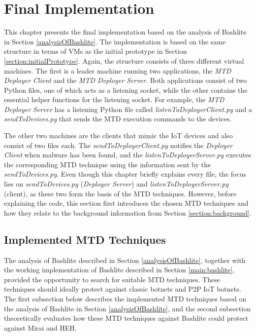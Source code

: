 





\section{Final Implementation} \label{section:finalImplementation}
This chapter presents the final implementation based on the analysis of Bashlite in Section \ref{analysisOfBashlite}. The implementation is based on the same structure in terms of VMs as the initial prototype in Section \ref{section:initialPrototype}. Again, the structure consists of three different virtual machines. The first is a leader machine running two applications, the \textit{MTD Deployer Client} and the \textit{MTD Deployer Server}. Both applications consist of two Python files, one of which acts as a listening socket, while the other contains the essential helper functions for the listening socket. For example, the \textit{MTD Deployer Server} has a listening Python file called \textit{listenToDeployerClient.py} and a \textit{sendToDevices.py} that sends the MTD execution commands to the devices.

The other two machines are the clients that mimic the IoT devices and also consist of two files each. The \textit{sendToDeployerClient.py} notifies the \textit{Deployer Client} when malware has been found, and the \textit{listenToDeployerServer.py} executes the corresponding MTD technique using the information sent by the \textit{sendToDevices.py}.
Even though this chapter briefly explains every file, the focus lies on \textit{sendToDevices.py} (\textit{Deployer Server}) and \textit{listenToDeployerServer.py} (client), as these two form the basis of the MTD techniques. However, before explaining the code, this section first introduces the chosen MTD techniques and how they relate to the background information from Section \ref{section:background}. 

\subsection{Implemented MTD Techniques} \label{section:implementedMTDTechniques}
The analysis of Bashlite described in Section \ref{analysisOfBashlite}, together with the working implementation of Bashlite described in Section \ref{main:bashlite}, provided the opportunity to search for suitable MTD techniques. These techniques should ideally protect against classic botnets and P2P IoT botnets. The first subsection below describes the implemented MTD techniques based on the analysis of Bashlite in Section \ref{analysisOfBashlite}, and the second subsection theoretically evaluates how these MTD techniques against Bashlite could protect against Mirai and HEH.


